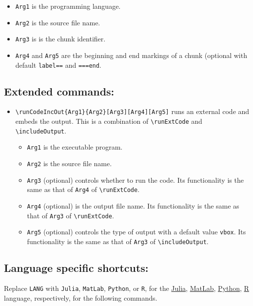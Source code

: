 \documentclass{ltxdoc}
\begin{document}
\begin{itemize}
\begin{itemize}
\item \texttt{Arg1} is the programming language.
\item \texttt{Arg2} is the source file name.
\item \texttt{Arg3} is is the chunk identifier.
\item \texttt{Arg4} and \texttt{Arg5} are the beginning and end markings of a chunk (optional with
default \texttt{label==} and \texttt{===end}.
\end{itemize}
\end{itemize}



\subsection{Extended commands:}
\label{sec:orgf1638ce}
\begin{itemize}
\item \texttt{\textbackslash{}runCodeIncOut\{Arg1\}\{Arg2\}[Arg3][Arg4][Arg5]} runs an external code and
embeds the output. This is a combination of \texttt{\textbackslash{}runExtCode} and \texttt{\textbackslash{}includeOutput}.
\begin{itemize}
\item \texttt{Arg1} is the executable program.
\item \texttt{Arg2} is the source file name.
\item \texttt{Arg3} (optional) controls whether to run the code. Its functionality is the
same as that of \texttt{Arg4} of \texttt{\textbackslash{}runExtCode}.
\item \texttt{Arg4} (optional) is the output file name. Its functionality is the same as
that of \texttt{Arg3} of \texttt{\textbackslash{}runExtCode}.
\item \texttt{Arg5} (optional) controls the type of output with a default value \texttt{vbox}. Its
functionality is the same as that of \texttt{Arg3} of \texttt{\textbackslash{}includeOutput}.
\end{itemize}
\end{itemize}

\subsection{Language specific shortcuts:}
\label{sec:org8195ea0}
Replace \texttt{LANG} with \texttt{Julia}, \texttt{MatLab}, \texttt{Python}, or \texttt{R}, for the \href{https://julialang.org/}{Julia}, \href{https://www.mathworks.com/products/matlab.html}{MatLab}, \href{https://www.python.org/}{Python}, \href{https://www.r-project.org/}{R}
language, respectively, for the following commands.
\end{document}
